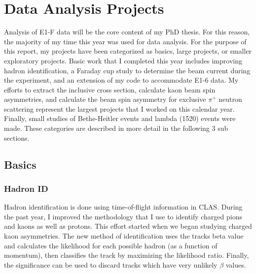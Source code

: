 %
%
\section{Data Analysis Projects}
Analysis of E1-F data will be the core content of my PhD thesis.  For this reason, the majority of my time this year was used for data analysis.  For the purpose of this report, my projects have been categorized as basics, large projects, or smaller exploratory projects.  Basic work that I completed this year includes improving hadron identification, a Faraday cup study to determine the beam current during the experiment, and an extension of my code to accommodate E1-6 data.  My efforts to extract the inclusive cross section, calculate kaon beam spin asymmetries, and calculate the beam spin asymmetry for exclusive $\pi^+$ neutron scattering represent the largest projects that I worked on this calendar year.  Finally, small studies of Bethe-Heitler events and lambda (1520) events were made.  These categories are described in more detail in the following 3 sub sections.  

\subsection{Basics}

\subsubsection{Hadron ID}
Hadron identification is done using time-of-flight information in CLAS.  During the past year, I improved the methodology that I use to identify charged pions and kaons as well as protons.  This effort started when we began studying charged kaon asymmetries.  The new method of identification uses the tracks beta value and calculates the likelihood for each possible hadron (as a function of momentum), then classifies the track by maximizing the likelihood ratio.  Finally, the significance can be used to discard tracks which have very unlikely $\beta$ values.  

